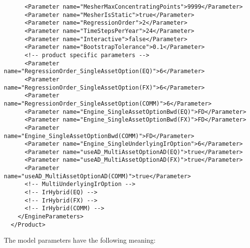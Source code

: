 \begin{verbatim}
      <Parameter name="MesherMaxConcentratingPoints">9999</Parameter>
      <Parameter name="MesherIsStatic">true</Parameter>
      <Parameter name="RegressionOrder">2</Parameter>
      <Parameter name="TimeStepsPerYear">24</Parameter>
      <Parameter name="Interactive">false</Parameter>
      <Parameter name="BootstrapTolerance">0.1</Parameter>
      <!-- product specific parameters -->
      <Parameter name="RegressionOrder_SingleAssetOption(EQ)">6</Parameter>
      <Parameter name="RegressionOrder_SingleAssetOption(FX)">6</Parameter>
      <Parameter name="RegressionOrder_SingleAssetOption(COMM)">6</Parameter>
      <Parameter name="Engine_SingleAssetOptionBwd(EQ)">FD</Parameter>
      <Parameter name="Engine_SingleAssetOptionBwd(FX)">FD</Parameter>
      <Parameter name="Engine_SingleAssetOptionBwd(COMM)">FD</Parameter>
      <Parameter name="Engine_SingleUnderlyingIrOption">6</Parameter>
      <Parameter name="useAD_MultiAssetOptionAD(EQ)">true</Parameter>
      <Parameter name="useAD_MultiAssetOptionAD(FX)">true</Parameter>
      <Parameter name="useAD_MultiAssetOptionAD(COMM)">true</Parameter>
      <!-- MultiUnderlyingIrOption -->
      <!-- IrHybrid(EQ) -->
      <!-- IrHybrid(FX) -->
      <!-- IrHybrid(COMM) -->
    </EngineParameters>
  </Product>
\end{verbatim}

The model parameters have the following meaning:

